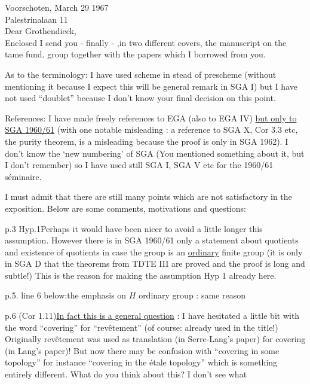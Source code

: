 Voorschoten, March 29 1967\\
Palestrinalaan 11\\

Dear Grothendieck,\\

Enclosed I send you - finally - ,in two different covers, the manuscript on the tame fund. group together with the papers which I borrowed from you.

As to the terminology: I have used scheme in stead of prescheme (without mentioning it because I expect this will be  general remark in SGA I) but I have not used ``doublet'' because I don't know your final decision on this point.

References: I have made freely references to EGA (also to EGA IV) \uline{but only to SGA 1960/61} (with one notable misleading : a reference to SGA X, Cor 3.3 etc, the purity theorem, is a misleading because the proof is only in SGA 1962). I don't know the `new numbering' of SGA (You mentioned something about it, but I don't remember) so I have used still SGA I, SGA V etc for the 1960/61 séminaire.

I must admit that there are still many points which are not satisfactory in the exposition. Below are some comments, motivations and questions:

p.3 Hyp.1\quad Perhaps it would have been nicer to avoid a little longer this assumption. However there is in SGA 1960/61 only a statement about quotients and existence of quotients in case the group is an \uline{ordinary} finite group (it is only in SGA D that the theorems from TDTE III are proved and the proof is long and subtle!) This is the reason for making the assumption Hyp 1 already here.

p.5. line 6 below:\quad the emphasis on $H$ ordinary group : same reason

p.6 (Cor 1.11)\quad \uline{In fact this is a general question} : I have hesitated a little bit with the word ``covering'' for ``revêtement'' (of course: already used in the title!)
Originally revêtement was used as translation  (in Serre-Lang's paper) for covering (in Lang's paper)! But now there may be confusion with ``covering in some topology'' for instance ``covering in the étale topology'' which is something entirely different. What do you think about this? I don't see what
